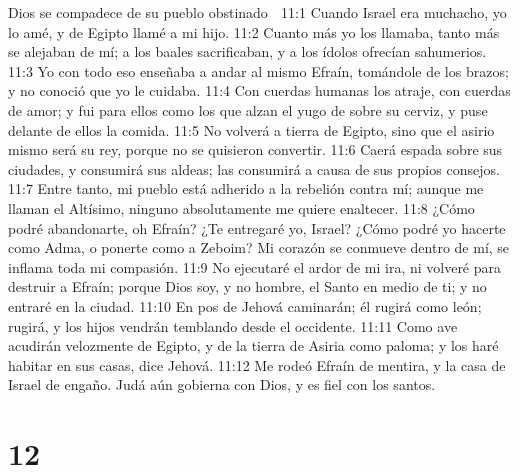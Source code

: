 Dios se compadece de su pueblo obstinado  

11:1 Cuando Israel era muchacho, yo lo amé, y de Egipto llamé a mi hijo. 
11:2 Cuanto más yo los llamaba, tanto más se alejaban de mí; a los baales sacrificaban, y a los ídolos ofrecían sahumerios.  
11:3 Yo con todo eso enseñaba a andar al mismo Efraín, tomándole de los brazos; y no conoció que yo le cuidaba.  
11:4 Con cuerdas humanas los atraje, con cuerdas de amor; y fui para ellos como los que alzan el yugo de sobre su cerviz, y puse delante de ellos la comida.  
11:5 No volverá a tierra de Egipto, sino que el asirio mismo será su rey, porque no se quisieron convertir.  
11:6 Caerá espada sobre sus ciudades, y consumirá sus aldeas; las consumirá a causa de sus propios consejos. 
11:7 Entre tanto, mi pueblo está adherido a la rebelión contra mí; aunque me llaman el Altísimo, ninguno absolutamente me quiere enaltecer.  
11:8 ¿Cómo podré abandonarte, oh Efraín? ¿Te entregaré yo, Israel? ¿Cómo podré yo hacerte como Adma, o ponerte como a Zeboim? Mi corazón se conmueve dentro de mí, se inflama toda mi compasión.  
11:9 No ejecutaré el ardor de mi ira, ni volveré para destruir a Efraín; porque Dios soy, y no hombre, el Santo en medio de ti; y no entraré en la ciudad.  
11:10 En pos de Jehová caminarán; él rugirá como león; rugirá, y los hijos vendrán temblando desde el occidente.  
11:11 Como ave acudirán velozmente de Egipto, y de la tierra de Asiria como paloma; y los haré habitar en sus casas, dice Jehová. 
11:12 Me rodeó Efraín de mentira, y la casa de Israel de engaño. Judá aún gobierna con Dios, y es fiel con los santos.  

\chapter{12}

